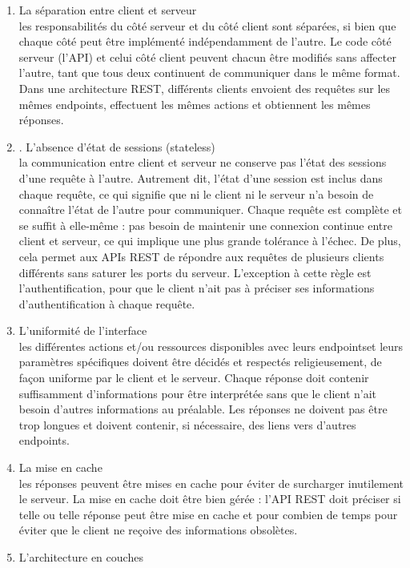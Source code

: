 \begin{enumerate}
	\item La séparation entre client et serveur\\
les responsabilités du côté serveur et du côté client sont
séparées, si bien que chaque côté peut être implémenté indépendamment de l’autre. Le code
côté serveur (l’API) et celui côté client peuvent chacun être modifiés sans affecter l’autre, tant
que tous deux continuent de communiquer dans le même format. Dans une architecture REST,
différents clients envoient des requêtes sur les mêmes endpoints, effectuent les mêmes actions et
obtiennent les mêmes réponses.
     \item . L’absence d’état de sessions (stateless)\\
la communication entre client et serveur ne conserve pas
l’état des sessions d’une requête à l’autre. Autrement dit, l’état d’une session est inclus dans
chaque requête, ce qui signifie que ni le client ni le serveur n’a besoin de connaître l’état de
l’autre pour communiquer. Chaque requête est complète et se suffit à elle-même : pas besoin de maintenir une connexion continue entre client et serveur, ce qui implique une plus
grande tolérance à l’échec. De plus, cela permet aux APIs REST de répondre aux requêtes
de plusieurs clients différents sans saturer les ports du serveur. L’exception à cette règle est
l’authentification, pour que le client n’ait pas à préciser ses informations d’authentification à
chaque requête.
      \item L’uniformité de l’interface\\
les différentes actions et/ou ressources disponibles avec leurs endpointset leurs paramètres spécifiques doivent être décidés et respectés religieusement, de façon
uniforme par le client et le serveur. Chaque réponse doit contenir suffisamment d’informations
pour être interprétée sans que le client n’ait besoin d’autres informations au préalable. Les
réponses ne doivent pas être trop longues et doivent contenir, si nécessaire, des liens vers d’autres
endpoints. 
       \item La mise en cache\\
les réponses peuvent être mises en cache pour éviter de surcharger inutilement le serveur. La mise en cache doit être bien gérée : l’API REST doit préciser si telle ou telle
réponse peut être mise en cache et pour combien de temps pour éviter que le client ne reçoive
des informations obsolètes.
        \item L’architecture en couches\\

\end{enumerate}
